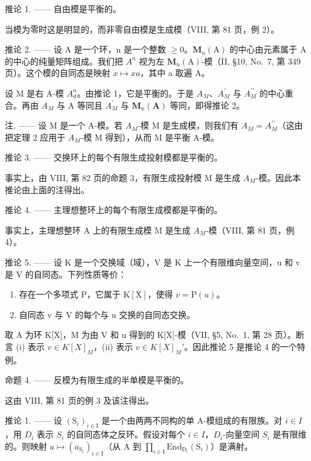 推论 1. —— 自由模是平衡的。

当模为零时这是明显的，而非零自由模是生成模（VIII, 第 81 页，例 2）。

推论 2. —— 设 A 是一个环，n 是一个整数 \(\geqslant 0\)。\(\mathbf{M}_{n}(\mathrm{A})\) 的中心由元素属于 A 的中心的纯量矩阵组成。我们把 \(A^{n}\) 视为左 \(\mathbf{M}_{n}(\mathrm{A})\)-模（II, §10, No.~7, 第 349 页）。这个模的自同态是映射 \(x \mapsto xa\)，其中 a 取遍 A。

设 M 是右 A-模 \(A_{d}^{n}\)。由推论 1，它是平衡的。于是 \(A_{M}\)、\(A_{M}^{\prime}\) 与 \(A_{M}^{\prime\prime}\) 的中心重合。再由 \(A_{M}\) 与 A 等同且 \(A_{M}^{\prime}\) 与 \(\mathbf{M}_{n}(\mathbf{A})\) 等同，即得推论 2。

注. —— 设 M 是一个 A-模。若 \(A_{M}\)-模 M 是生成模，则我们有 \(A_{M} = A_{M}^{\prime\prime}\)（这由把定理 2 应用于 \(A_{M}\)-模 M 得到），从而 M 是平衡 A-模。

推论 3. —— 交换环上的每个有限生成投射模都是平衡的。

事实上，由 VIII, 第 82 页的命题 3，有限生成投射模 M 是生成 \(A_{M}\)-模。因此本推论由上面的注得出。

推论 4. —— 主理想整环上的每个有限生成模都是平衡的。

事实上，主理想整环 A 上的有限生成模 M 是生成 \(A_{M}\)-模（VIII, 第 81 页，例 4）。

推论 5. —— 设 K 是一个交换域（域），V 是 K 上一个有限维向量空间，u 和 v 是 V 的自同态。下列性质等价：

\begin{enumerate}
\def\labelenumi{(\roman{enumi})}
\item
  存在一个多项式 \(\mathrm{P}\)，它属于 \(\mathrm{K}[\mathrm{X}]\)，使得 \(v = \mathrm{P}(u)\)。
\item
  自同态 v 与 V 的每个与 u 交换的自同态交换。
\end{enumerate}

取 A 为环 K{[}X{]}，M 为由 V 和 u 得到的 K{[}X{]}-模（VII, §5, No.~1, 第 28 页）。断言 (i) 表示 \(v \in K[X]_{M}\)，(ii) 表示 \(v \in K[X]_{M}'\)。因此推论 5 是推论 4 的一个特例。

命题 4. —— 反模为有限生成的半单模是平衡的。

这由 VIII, 第 81 页的例 3 及该注得出。

推论 1. —— 设 \((\mathrm{S}_{i})_{i\in\mathrm{I}}\) 是一个由两两不同构的单 A-模组成的有限族。对 \(i\in I\)，用 \(D_{i}\) 表示 \(S_{i}\) 的自同态体之反环。假设对每个 \(i\in I\)，\(D_{i}\)-向量空间 \(S_{i}\) 是有限维的。则映射 \(a \mapsto (a_{\mathrm{S}_i})_{i \in \mathrm{I}}\)（从 A 到 \(\prod_{i \in \mathrm{I}} \mathrm{End}_{\mathrm{D}_i}(\mathrm{S}_i)\)）是满射。

